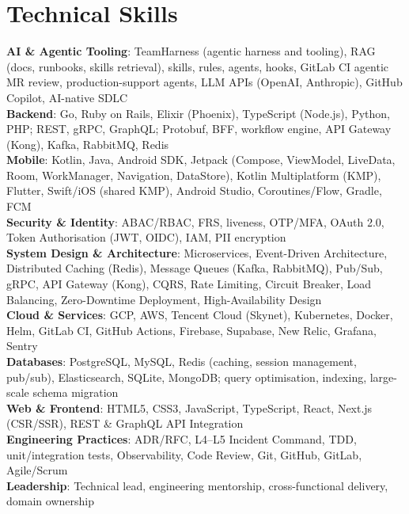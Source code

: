 \documentclass[11pt]{article}
\begin{document}
\section*{Technical Skills}
\textbf{AI \& Agentic Tooling}: TeamHarness (agentic harness and tooling), RAG (docs, runbooks, skills retrieval), skills, rules, agents, hooks, GitLab CI agentic MR review, production-support agents, LLM APIs (OpenAI, Anthropic), GitHub Copilot, AI-native SDLC\\
\textbf{Backend}: Go, Ruby on Rails, Elixir (Phoenix), TypeScript (Node.js), Python, PHP; REST, gRPC, GraphQL; Protobuf, BFF, workflow engine, API Gateway (Kong), Kafka, RabbitMQ, Redis\\
\textbf{Mobile}: Kotlin, Java, Android SDK, Jetpack (Compose, ViewModel, LiveData, Room, WorkManager, Navigation, DataStore), Kotlin Multiplatform (KMP), Flutter, Swift/iOS (shared KMP), Android Studio, Coroutines/Flow, Gradle, FCM\\
\textbf{Security \& Identity}: ABAC/RBAC, FRS, liveness, OTP/MFA, OAuth 2.0, Token Authorisation (JWT, OIDC), IAM, PII encryption\\
\textbf{System Design \& Architecture}: Microservices, Event-Driven Architecture, Distributed Caching (Redis), Message Queues (Kafka, RabbitMQ), Pub/Sub, gRPC, API Gateway (Kong), CQRS, Rate Limiting, Circuit Breaker, Load Balancing, Zero-Downtime Deployment, High-Availability Design\\
\textbf{Cloud \& Services}: GCP, AWS, Tencent Cloud (Skynet), Kubernetes, Docker, Helm, GitLab CI, GitHub Actions, Firebase, Supabase, New Relic, Grafana, Sentry\\
\textbf{Databases}: PostgreSQL, MySQL, Redis (caching, session management, pub/sub), Elasticsearch, SQLite, MongoDB; query optimisation, indexing, large-scale schema migration\\
\textbf{Web \& Frontend}: HTML5, CSS3, JavaScript, TypeScript, React, Next.js (CSR/SSR), REST \& GraphQL API Integration\\
\textbf{Engineering Practices}: ADR/RFC, L4–L5 Incident Command, TDD, unit/integration tests, Observability, Code Review, Git, GitHub, GitLab, Agile/Scrum\\
\textbf{Leadership}: Technical lead, engineering mentorship, cross-functional delivery, domain ownership\\
\end{document}
